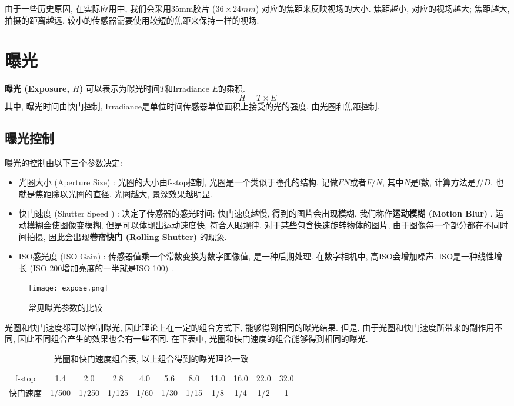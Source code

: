 \documentclass[openany]{progbookcn}
\begin{document}
由于一些历史原因, 在实际应用中, 我们会采用35mm胶片 ($36\times 24 mm$) 对应的焦距来反映视场的大小. 焦距越小, 对应的视场越大; 焦距越大, 拍摄的距离越远. 较小的传感器需要使用较短的焦距来保持一样的视场. 

\section{曝光}

\textbf{曝光 (Exposure, $H$) }可以表示为曝光时间$T$和Irradiance $E$的乘积. 
\begin{equation}
	H=T\times E
\end{equation}
其中, 曝光时间由快门控制, Irradiance是单位时间传感器单位面积上接受的光的强度, 由光圈和焦距控制. 

\subsection{曝光控制}

曝光的控制由以下三个参数决定: 
\begin{itemize}
	\item 光圈大小 (Aperture Size) : 光圈的大小由f-stop控制, 光圈是一个类似于瞳孔的结构. 记做$FN$或者$F/N$, 其中$N$是f数, 计算方法是$f/D$, 也就是焦距除以光圈的直径. 光圈越大, 景深效果越明显. 
	\item 快门速度 (Shutter Speed ) : 决定了传感器的感光时间; 快门速度越慢, 得到的图片会出现模糊, 我们称作\textbf{运动模糊 (Motion Blur) }. 运动模糊会使图像变模糊, 但是可以体现出运动速度快, 符合人眼规律. 对于某些包含快速旋转物体的图片, 由于图像每一个部分都在不同时间拍摄, 因此会出现\textbf{卷帘快门 (Rolling Shutter) }的现象. 
	\item ISO感光度 (ISO Gain) : 传感器值乘一个常数变换为数字图像值, 是一种后期处理. 在数字相机中, 高ISO会增加噪声. ISO是一种线性增长 (ISO 200增加亮度的一半就是ISO 100) . 
\end{itemize}

\begin{figure}[H]
	\centering
	\texttt{[image: expose.png]}
	\caption{常见曝光参数的比较}
	\label{fig:expose}
\end{figure}

光圈和快门速度都可以控制曝光, 因此理论上在一定的组合方式下, 能够得到相同的曝光结果. 但是, 由于光圈和快门速度所带来的副作用不同, 因此不同组合产生的效果也会有一些不同. 在下表中, 光圈和快门速度的组合能够得到相同的曝光. 

\begin{table}[H]
	\centering
	\begin{tabular}{ccccccccccc}
		\hline
		f-stop & 1.4   & 2.0   & 2.8   & 4.0  & 5.6  & 8.0  & 11.0 & 16.0 & 22.0 & 32.0 \\
		快门速度   & 1/500 & 1/250 & 1/125 & 1/60 & 1/30 & 1/15 & 1/8  & 1/4  & 1/2  & 1 \\	\hline
	\end{tabular}
	\caption{光圈和快门速度组合表, 以上组合得到的曝光理论一致}
\end{table}
\end{document}

